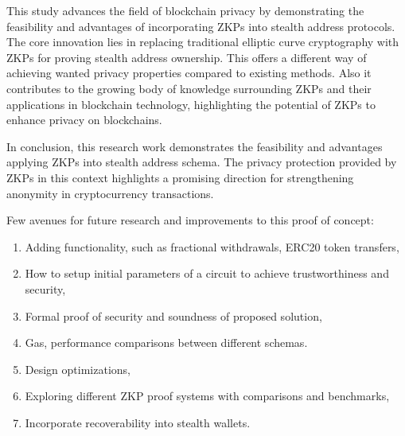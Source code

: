 \documentclass[conference,comsoc,10pt]{IEEEtran}
\begin{document}
    This study advances the field of blockchain privacy by demonstrating the
    feasibility and advantages of incorporating ZKPs into stealth address
    protocols. The core innovation lies in replacing traditional elliptic
    curve cryptography with ZKPs for proving stealth address ownership. This
    offers a different way of achieving wanted privacy properties compared to
    existing methods. Also it contributes to the growing body of knowledge
    surrounding ZKPs and their applications in blockchain technology,
    highlighting the potential of ZKPs to enhance privacy on blockchains.

    In conclusion, this research work demonstrates the feasibility and
    advantages applying ZKPs into stealth address schema. The privacy
    protection provided by ZKPs in this context highlights a promising
    direction for strengthening anonymity in cryptocurrency transactions.

    Few avenues for future research and improvements to this proof of concept:
    \begin{enumerate}
        \item Adding functionality, such as fractional withdrawals, ERC20 token transfers,
        \item How to setup initial parameters of a circuit to achieve trustworthiness
                and security,
        \item Formal proof of security and soundness of proposed solution,
        \item Gas, performance comparisons between different schemas.
        \item Design optimizations,
        \item Exploring different ZKP proof systems with comparisons and benchmarks,
        \item Incorporate recoverability into stealth wallets.
    \end{enumerate}
\end{document}
